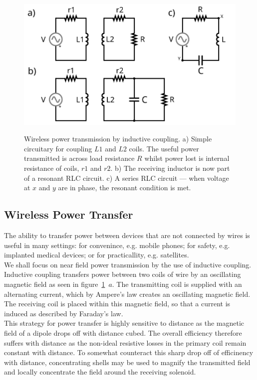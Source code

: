 \documentclass[11pt]{iopart}
\begin{document}
\begin{figure}
  \begin{center}
   \noindent\includegraphics[width=0.75\linewidth]{images/WPT.pdf}
  \label{fig:WPT}
  \end{center}
  \caption{Wireless power transmission by inductive coupling. a)
    Simple circuitary for coupling $L1$ and $L2$ coils. The useful
    power transmitted is across load resistance $R$ whilst power lost
    is internal resistance of coils, $r1$ and $r2$. b) The receiving
    inductor is now part of a resonant RLC circuit. c) A series RLC
    circuit --- when voltage at $x$ and $y$ are in phase, the resonant
    condition is met.}
\end{figure}

\subsection{Wireless Power Transfer}
The ability to transfer power between devices that are not connected
by wires is useful in many settings: for convenince, e.g. mobile
phones; for safety, e.g. implanted medical devices; or for
practicallity, e.g. satellites.\\ We shall focus on near field power
transmission by the use of inductive coupling. Inductive coupling
transfers power between two coils of wire by an oscillating magnetic
field as seen in figure~\ref{fig:WPT}~$a$. The transmitting coil is
supplied with an alternating current, which by Ampere's law creates an
oscillating magnetic field. The receiving coil is placed within this
magnetic field, so that a current is induced as described by Faraday's
law.\\ This strategy for power transfer is highly sensitive to
distance as the magnetic field of a dipole drops off with distance
cubed.  The overall efficiency therefore suffers with distance as the
non-ideal resistive losses in the primary coil remain constant with
distance. To somewhat counteract this sharp drop off of efficinency
with distance, concentrating shells may be used to magnify the
transmitted field and locally concentrate the field around the
receiving solenoid. \\
\end{document}
